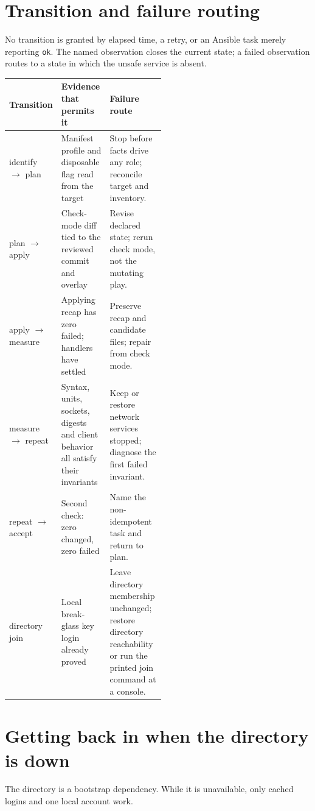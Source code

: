 
\section{Transition and failure routing}
No transition is granted by elapsed time, a retry, or an Ansible task merely
reporting \texttt{ok}. The named observation closes the current state; a failed
observation routes to a state in which the unsafe service is absent.

\begin{tabularx}{\linewidth}{@{}p{0.20\linewidth}p{0.31\linewidth}L@{}}
\toprule
\textbf{Transition} & \textbf{Evidence that permits it} &
\textbf{Failure route}\\
\midrule
identify $\rightarrow$ plan & Manifest profile and disposable flag read from
the target & Stop before facts drive any role; reconcile target and inventory.\\
plan $\rightarrow$ apply & Check-mode diff tied to the reviewed commit and
overlay & Revise declared state; rerun check mode, not the mutating play.\\
apply $\rightarrow$ measure & Applying recap has zero failed; handlers have
settled & Preserve recap and candidate files; repair from check mode.\\
measure $\rightarrow$ repeat & Syntax, units, sockets, digests and client
behavior all satisfy their invariants & Keep or restore network services
stopped; diagnose the first failed invariant.\\
repeat $\rightarrow$ accept & Second check: zero changed, zero failed & Name
the non-idempotent task and return to plan.\\
directory join & Local break-glass key login already proved & Leave directory
membership unchanged; restore directory reachability or run the printed join
command at a console.\\
\bottomrule
\end{tabularx}

\section{Getting back in when the directory is down}
The directory is a bootstrap dependency. While it is unavailable, only cached
logins and one local account work.

